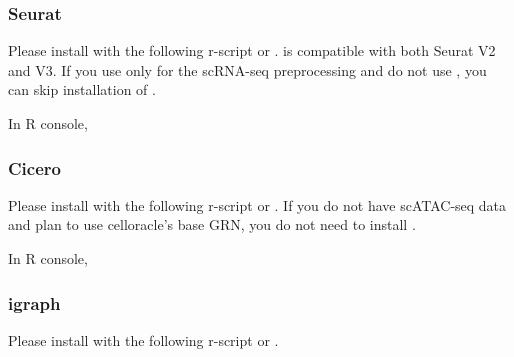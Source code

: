 \documentclass[letterpaper,10pt,english]{sphinxmanual}
\begin{document}
\subsubsection{Seurat}
\label{\detokenize{installation/index:id3}}
Please install  with the following r-script or  .
 is compatible with both Seurat V2 and V3.
If you use only  for the scRNA-seq preprocessing and do not use  , you can skip installation of .

In R console,

\begin{sphinxVerbatim}[commandchars=\\\{\}]
\end{sphinxVerbatim}


\subsubsection{Cicero}
\label{\detokenize{installation/index:id5}}
Please install  with the following r-script or  .
If you do not have scATAC-seq data and plan to use celloracle’s base GRN, you do not need to install .

In R console,

\begin{sphinxVerbatim}[commandchars=\\\{\}]
   
\end{sphinxVerbatim}


\subsubsection{igraph}
\label{\detokenize{installation/index:id7}}
Please install  with the following r-script or  .
\end{document}
